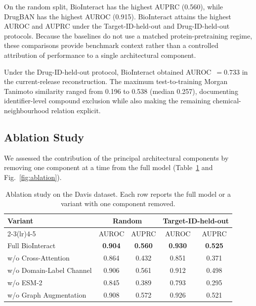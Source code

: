 \documentclass[fleqn,10pt]{wlscirep}
\begin{document}
\FloatBarrier

On the random split, BioInteract has the highest AUPRC (0.560), while DrugBAN
has the highest AUROC (0.915). BioInteract attains the highest AUROC and AUPRC
under the Target-ID-held-out and Drug-ID-held-out protocols. Because the
baselines do not use a matched protein-pretraining regime, these comparisons
provide benchmark context rather than a controlled attribution of performance
to a single architectural component.

Under the Drug-ID-held-out protocol, BioInteract obtained AUROC~$=0.733$ in the
current-release reconstruction. The maximum test-to-training Morgan Tanimoto
similarity ranged from 0.196 to 0.538 (median 0.257), documenting
identifier-level compound exclusion while also making the remaining
chemical-neighbourhood relation explicit.
\endgroup

{\color{red}\subsection{Ablation Study}}

\begingroup\color{red}
We assessed the contribution of the principal architectural components by
removing one component at a time from the full model (Table~\ref{tab:ablation}
and Fig.~\ref{fig:ablation}).

\begin{table}[htbp]
\centering
\caption{Ablation study on the Davis dataset. Each row reports the full model or
  a variant with one component removed.}
\label{tab:ablation}
\begin{tabular}{lcccc}
\toprule
\textbf{Variant} & \multicolumn{2}{c}{\textbf{Random}} &
                   \multicolumn{2}{c}{\textbf{Target-ID-held-out}} \\
\cmidrule(lr){2-3}\cmidrule(lr){4-5}
 & AUROC & AUPRC & AUROC & AUPRC \\
\midrule
Full BioInteract & \textbf{0.904} & \textbf{0.560} & \textbf{0.930} & \textbf{0.525} \\
w/o Cross-Attention & 0.864 & 0.432 & 0.851 & 0.371 \\
w/o Domain-Label Channel & 0.906 & 0.561 & 0.912 & 0.498 \\
w/o ESM-2 & 0.845 & 0.389 & 0.793 & 0.295 \\
w/o Graph Augmentation & 0.908 & 0.572 & 0.926 & 0.521 \\
\bottomrule
\end{tabular}
\end{table}
\end{document}
